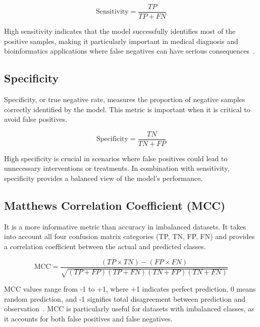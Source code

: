     \begin{equation}
      \text{Sensitivity} = \frac{TP}{TP + FN}\label{eq:sensitivity}
    \end{equation}

    High sensitivity indicates that the model successfully identifies most of the positive samples, making it particularly important in medical diagnosis and bioinformatics applications where false negatives can have serious consequences~\cite{powers_evaluation_2020}.

  \subsection{Specificity}\label{subsec:specificity}
    Specificity, or true negative rate, measures the proportion of negative samples correctly identified by the model.
    This metric is important when it is critical to avoid false positives.

    \begin{equation}
      \text{Specificity} = \frac{TN}{TN + FP}\label{eq:specificity}
    \end{equation}

    High specificity is crucial in scenarios where false positives could lead to unnecessary interventions or treatments.
    In combination with sensitivity, specificity provides a balanced view of the model's performance.

  \subsection{Matthews Correlation Coefficient (MCC)}\label{subsec:mcc}
    It is a more informative metric than accuracy in imbalanced datasets.
    It takes into account all four confusion matrix categories (TP, TN, FP, FN) and provides a correlation coefficient between the actual and predicted classes.

    \begin{equation}
      \text{MCC} = \frac{(TP \times TN) - (FP \times FN)}{\sqrt{(TP + FP)(TP + FN)(TN + FP)(TN + FN)}}\label{eq:mcc}
    \end{equation}

    MCC values range from -1 to +1, where +1 indicates perfect prediction, 0 means random prediction, and -1 signifies total disagreement between prediction and observation~\cite{baldi_assessing_2000}.
    MCC is particularly useful for datasets with imbalanced classes, as it accounts for both false positives and false negatives.



